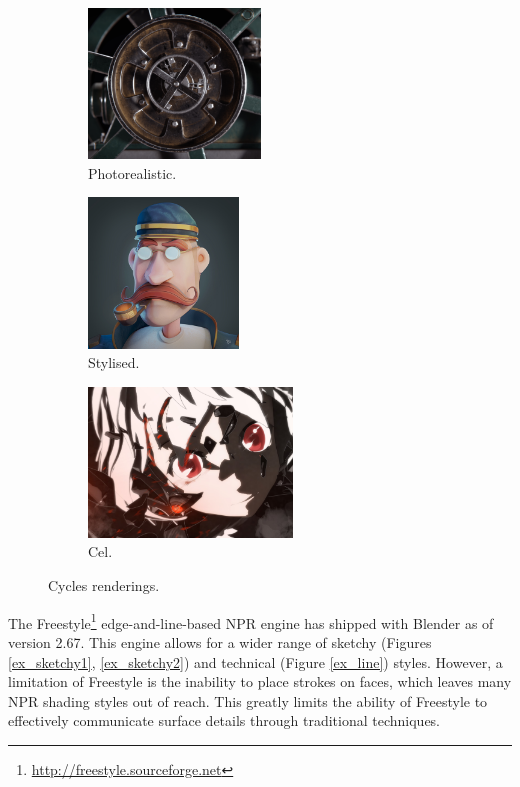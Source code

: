 \begin{figure}[h]
	\centering
	\begin{subfigure}[b]{0.3\textwidth}
		\includegraphics[height=4cm]{images/ex_photoreal}
		\caption{Photorealistic.}\label{ex_photoreal}
	\end{subfigure}
	\begin{subfigure}[b]{0.3\textwidth}
		\includegraphics[height=4cm]{images/ex_toon1}
		\caption{Stylised.}\label{ex_toon1}
	\end{subfigure}
	\begin{subfigure}[b]{0.3\textwidth}
		\includegraphics[height=4cm]{images/ex_toon2}
		\caption{Cel.}\label{ex_toon2}
	\end{subfigure}
	\caption{Cycles renderings.}
\end{figure}

The Freestyle\footnote{\url{http://freestyle.sourceforge.net}} edge-and-line-based NPR engine has shipped with Blender as of version 2.67. This engine allows for a wider range of sketchy (Figures \ref{ex_sketchy1}, \ref{ex_sketchy2}) and technical (Figure \ref{ex_line}) styles. However, a limitation of Freestyle is the inability to place strokes on faces, which leaves many NPR shading styles out of reach. This greatly limits the ability of Freestyle to effectively communicate surface details through traditional techniques.

